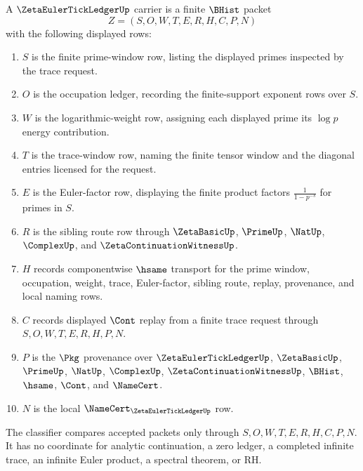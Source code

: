 \begin{definition}
\label{def:zeta-euler-tick-ledger-carrier}
A $\ZetaEulerTickLedgerUp$ carrier is a finite $\BHist$ packet
$$
Z=(S,O,W,T,E,R,H,C,P,N)
$$
with the following displayed rows:
\begin{enumerate}
\item $S$ is the finite prime-window row, listing the displayed primes inspected by the trace request.
\item $O$ is the occupation ledger, recording the finite-support exponent rows over $S$.
\item $W$ is the logarithmic-weight row, assigning each displayed prime its $\log p$ energy contribution.
\item $T$ is the trace-window row, naming the finite tensor window and the diagonal entries licensed for the request.
\item $E$ is the Euler-factor row, displaying the finite product factors $\frac{1}{1-p^{-s}}$ for primes in $S$.
\item $R$ is the sibling route row through $\ZetaBasicUp$, $\PrimeUp$, $\NatUp$, $\ComplexUp$, and $\ZetaContinuationWitnessUp$.
\item $H$ records componentwise $\hsame$ transport for the prime window, occupation, weight, trace, Euler-factor, sibling route, replay, provenance, and local naming rows.
\item $C$ records displayed $\Cont$ replay from a finite trace request through $S,O,W,T,E,R,H,P,N$.
\item $P$ is the $\Pkg$ provenance over $\ZetaEulerTickLedgerUp$, $\ZetaBasicUp$, $\PrimeUp$, $\NatUp$, $\ComplexUp$, $\ZetaContinuationWitnessUp$, $\BHist$, $\hsame$, $\Cont$, and $\NameCert$.
\item $N$ is the local $\NameCert_{\ZetaEulerTickLedgerUp}$ row.
\end{enumerate}
The classifier compares accepted packets only through $S,O,W,T,E,R,H,C,P,N$. It has no coordinate for analytic continuation, a zero ledger, a completed infinite trace, an infinite Euler product, a spectral theorem, or RH.
\end{definition}

